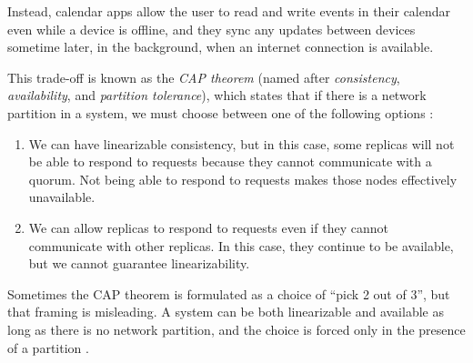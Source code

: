 \begin{frame}[plain]
    \label{s:calendar}
\end{frame}
\label{l:calendar}

Instead, calendar apps allow the user to read and write events in their calendar even while a device is offline, and they sync any updates between devices sometime later, in the background, when an internet connection is available.

This trade-off is known as the \emph{CAP theorem} (named after \emph{consistency}, \emph{availability}, and \emph{partition tolerance}), which states that if there is a network partition in a system, we must choose between one of the following options \citep{Gilbert:2002}:
\begin{enumerate}
    \item We can have linearizable consistency, but in this case, some replicas will not be able to respond to requests because they cannot communicate with a quorum.
        Not being able to respond to requests makes those nodes effectively unavailable.
    \item We can allow replicas to respond to requests even if they cannot communicate with other replicas.
        In this case, they continue to be available, but we cannot guarantee linearizability.
\end{enumerate}
Sometimes the CAP theorem is formulated as a choice of ``pick 2 out of 3'', but that framing is misleading.
A system can be both linearizable and available as long as there is no network partition, and the choice is forced only in the presence of a partition \citep{Kleppmann:2015}.

